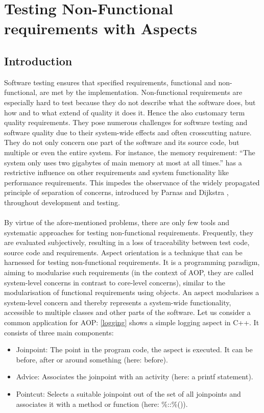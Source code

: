 \chapter{Testing Non-Functional requirements with Aspects}\label{sec:topic_10}

\section{Introduction}

Software testing ensures that specified requirements, functional and non-functional, are met by the implementation. Non-functional requirements are especially hard to test because they do not describe what the software does, but how and to what extend of quality it does it. Hence the also customary term quality requirements. They pose numerous challenges for software testing and software quality due to their system-wide effects and often crosscutting nature. They do not only concern one part of the software and its source code, but multiple or even the entire system. For instance, the memory requirement: \enquote{The system only uses two gigabytes of main memory at most at all times.} has a restrictive influence on other requirements and system functionality like performance requirements. This impedes the observance of the widely propagated principle of separation of concerns, introduced by Parnas \cite{Parnas} and Dijkstra \cite{Dijkstra}, throughout development and testing.\\
\\
By virtue of the afore-mentioned problems, there are only few tools and systematic approaches for testing non-functional requirements. Frequently, they are evaluated subjectively, resulting in a loss of traceability between test code, source code and requirements. Aspect orientation is a technique that can be harnessed for testing non-functional requirements. It is a programming paradigm, aiming to modularise such requirements (in the context of AOP, they are called system-level concerns in contrast to core-level concerns), similar to the modularisation of functional requirements using objects. An aspect modularises a system-level concern and thereby represents a system-wide functionality, accessible to multiple classes and other parts of the software. Let us consider a common application for AOP: \autoref{logging} shows a simple logging aspect in C++. It consists of three main components:
\begin{itemize}
\item Joinpoint: The point in the program code, the aspect is executed. It can be before, after or around something (here: before).
\item Advice: Associates the joinpoint with an activity (here: a printf statement). 
\item Pointcut: Selects a suitable joinpoint out of the set of all joinpoints and associates it with a method or function (here: \%::\%()).
\end{itemize}

